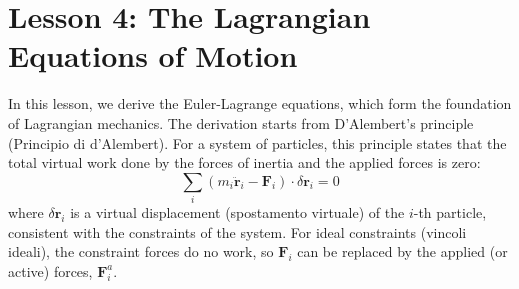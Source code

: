 \section*{Lesson 4: The Lagrangian Equations of Motion}

In this lesson, we derive the Euler-Lagrange equations, which form the foundation of Lagrangian mechanics. The derivation starts from D'Alembert's principle (Principio di d'Alembert). For a system of particles, this principle states that the total virtual work done by the forces of inertia and the applied forces is zero:
\[
    \sum_i (m_i\ddot{\mathbf{r}}_i - \mathbf{F}_i) \cdot \delta\mathbf{r}_i = 0
\]
where $\delta\mathbf{r}_i$ is a virtual displacement (spostamento virtuale) of the $i$-th particle, consistent with the constraints of the system. For ideal constraints (vincoli ideali), the constraint forces do no work, so $\mathbf{F}_i$ can be replaced by the applied (or active) forces, $\mathbf{F}_i^a$.

